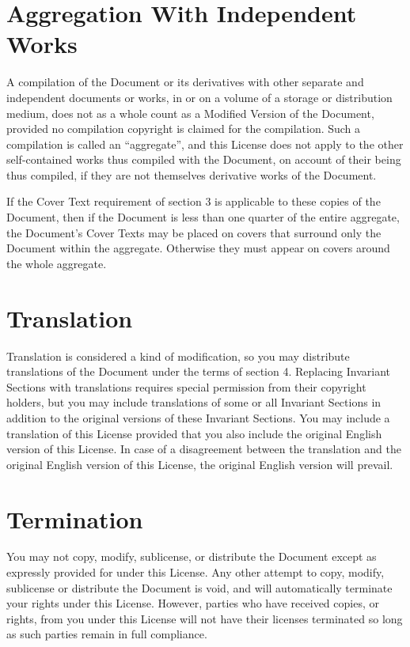 \documentclass[a4paper,11pt,twoside,dvips]{report}
\begin{document}
\section{Aggregation With Independent Works}

A compilation of the Document or its derivatives with other separate
and independent documents or works, in or on a volume of a storage or
distribution medium, does not as a whole count as a Modified Version
of the Document, provided no compilation copyright is claimed for the
compilation.  Such a compilation is called an ``aggregate'', and this
License does not apply to the other self-contained works thus compiled
with the Document, on account of their being thus compiled, if they
are not themselves derivative works of the Document.

If the Cover Text requirement of section 3 is applicable to these
copies of the Document, then if the Document is less than one quarter
of the entire aggregate, the Document's Cover Texts may be placed on
covers that surround only the Document within the aggregate.
Otherwise they must appear on covers around the whole aggregate.


\section{Translation}

Translation is considered a kind of modification, so you may
distribute translations of the Document under the terms of section 4.
Replacing Invariant Sections with translations requires special
permission from their copyright holders, but you may include
translations of some or all Invariant Sections in addition to the
original versions of these Invariant Sections.  You may include a
translation of this License provided that you also include the
original English version of this License.  In case of a disagreement
between the translation and the original English version of this
License, the original English version will prevail.


\section{Termination}

You may not copy, modify, sublicense, or distribute the Document except
as expressly provided for under this License.  Any other attempt to
copy, modify, sublicense or distribute the Document is void, and will
automatically terminate your rights under this License.  However,
parties who have received copies, or rights, from you under this
License will not have their licenses terminated so long as such
parties remain in full compliance.
\end{document}
